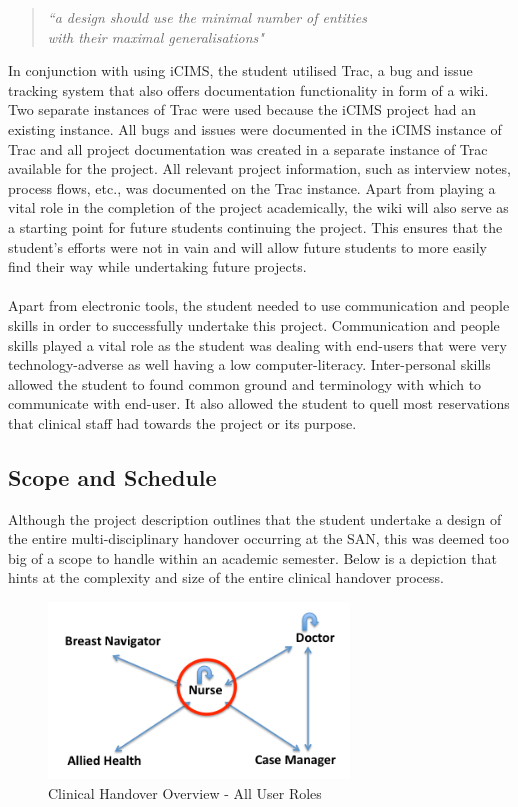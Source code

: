 \begin{quote}
\center\emph{``a design should use the minimal number of entities \\ with their maximal generalisations"}
\end{quote}
\vspace{6mm}
In conjunction with using iCIMS, the student utilised Trac, a bug and issue tracking system that also offers documentation functionality in form of a wiki. Two separate instances of Trac were used because the iCIMS project had an existing instance. All bugs and issues were documented in the iCIMS instance of Trac and all project documentation was created in a separate instance of Trac available for the project. All relevant project information, such as interview notes, process flows, etc., was documented on the Trac instance. Apart from playing a vital role in the completion of the project academically, the wiki will also serve as a starting point for future students continuing the project. This ensures that the student's efforts were not in vain and will allow future students to more easily find their way while undertaking future projects.
\\ \\
Apart from electronic tools, the student needed to use communication and people skills in order to successfully undertake this project. Communication and people skills played a vital role as the student was dealing with end-users that were very technology-adverse as well having a low computer-literacy. Inter-personal skills allowed the student to found common ground and terminology with which to communicate with end-user. It also allowed the student to quell most reservations that clinical staff had towards the project or its purpose.

\newpage
\subsection{Scope and Schedule}
Although the project description outlines that the student undertake a design of the entire multi-disciplinary handover occurring at the SAN, this was deemed too big of a scope to handle within an academic semester. Below is a depiction that hints at the complexity and size of the entire clinical handover process.

\begin{figure}[hp]
				\centering
				\includegraphics[scale=1.0, width=80mm]{Images/Clinical_Handover_All_Roles}
				\caption{Clinical Handover Overview - All User Roles}
\end{figure} 

